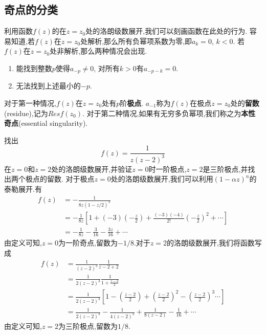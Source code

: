 \subsection{奇点的分类}
\label{subsec:singular_points}
利用函数$f(z)$的在$z=z_0$处的洛朗级数展开,我们可以刻画函数在此处的行为.
容易知道,若$f(z)$在$z=z_0$处解析,那么所有负幂项系数为零,即$a_k = 0$, $k<0$.
若$f(z)$在$z=z_0$处非解析,那么两种情况会出现.
\begin{enumerate}
    \item 能找到整数$p$使得$a_{-p} \neq 0$, 对所有$k>0$有$a_{-p - k}=0$.
    \item 无法找到上述最小的$-p$.
\end{enumerate}
对于第一种情况,$f(z)$在$z=z_0$处有$p$阶\textbf{极点}. $a_{-1}$称为$f(z)$在极点$z=z_0$处的\textbf{留数}(residue),记为$Res f(z_0)$.
对于第二种情况,如果有无穷多负幂项,我们称之为\textbf{本性奇点}(essential singularity).

\begin{examplebox}{找出\[f(z) = \frac{1}{z( z- 2)^3}\]
    在$z=0$和$z=2$处的洛朗级数展开,并验证$z=0$时一阶极点,$z=2$是三阶极点,并找出两个极点的留数.}
对于极点$z=0$处的洛朗级数展开,我们可以利用$(1-\alpha z)^n$的泰勒展开.有
\[
    \begin{aligned}
    f(z) &= -\frac{1}{8z(1-z/2)^3}
    \\
     &= -\frac{1}{8z}\left[ 1 + (-3) (-\frac{z}{2}) + \frac{(-3)(-4)}{2!} \left( -\frac{z}{2}\right)^2 + \cdots \right] 
    \\
     &= -\frac{1}{8z} - \frac{3}{16} - \frac{3z}{16} + \cdots   
    \end{aligned}
\]
由定义可知,$z=0$为一阶奇点,留数为$-1/8$.对于$z=2$的洛朗级数展开,我们将函数写成
\[
    \begin{aligned}
        f(z) &= \frac{1}{(z-2)^3} \frac{1}{z-2 + 2}
        \\
        &= \frac{1}{2(z-2)^3} \frac{1}{1+\frac{z-2}{2}}
        \\
        &= \frac{1}{2(z-2)^3} \left[ 1 - \left(\frac{z-2}{2} \right) + \left(\frac{z-2}{2}\right)^2 - \left(\frac{z-2}{2}\right)^3 \cdots \right] 
        \\
        &= \frac{1}{2(z-2)^3} - \frac{1}{4(z-2)^2} + \frac{1}{8(z-2)} - \frac{1}{16} + \cdots
    \end{aligned}
\]
由定义可知,$z=2$为三阶极点,留数为$1/8$.
\end{examplebox}

